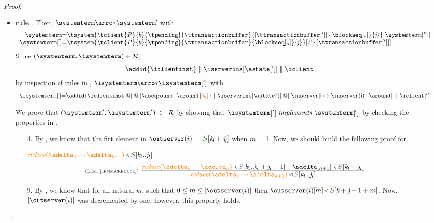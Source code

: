 \begin{proof}
\begin{itemize}
\begin{itemize}
				
				
				\item {\bf rule }. Then, $\systemterm  \arroi{\tau} \systemterm '$ with 
				\[\begin{array}{r@{=}l}
					\systemterm & \tsystem{\tclient{\tprogram}{\tknown}{\tpending}{\ttransactionbuffer}{[\tsenthead] \cdot \tsent}{\treceivebuffer}} [{\systemterm['']}]
					\\
					\systemterm['] & \tsystem{\tclient{\tprogram}{\tknown}{\tpending}{\ttransactionbuffer}{\tsent}{\treceivebuffer}}[\queuemessage \cdot [\tsenthead]]	
					
				  \end{array}
				\]
				Since $(\systemterm,\isystemterm)\in \mathcal{R}$,
				\[\addid{\iclientinst} \ \bigpar \ \iserverins[\astate[']] \ \bigpar\ \iclient\]
				by inspection of rules in \figref{}, 
				$\isystemterm \arroi{\tau} \isystemterm[']$ with
				\[\begin{array}{r@{=}l}
					\isystemterm['] & \addid{\iclientinst[@][@][\pending \cdot \around][\emptydelta]}
		\ \bigpar \ \iserverins[{\astate[']}][@][\inserver\upd{\cid}{\inserver(\cid)\cdot\around}]
		\ \bigpar\ \iclient[''] \\
				  \end{array}		
				\]
				
				We  prove that $(\systemterm',\isystemterm') \ \in \ \mathcal{R}$ by showing that $\implements{\isystemterm[']}{\systemterm[']}$ 
				by checking the properties in .			

						\begin{itemize}
							\item[4.] By , we know that the firt element in $\outserver(i)$ = $\queuemessage[\tknown_l+\treceivebuffer_l]$ when $m$ = 1. Now, we should build the following proof for 
							
						${\ireduce{\adelta_0\cdots\adelta_{h+1}}\triangleleft  \queuemessage[\tknown_l..\treceivebuffer_l]} \ $
					\[
						  \mathrulean{\lemref{lemma:reduce}}
						  {
								\ireduce{\adelta_0\cdots\adelta_{h}}\triangleleft  \queuemessage[\tknown_l..\tknown_l+\treceivebuffer_l - 1]
								\quad 
								\adelta[_{h+1}] \triangleleft \queuemessage[\tknown_l + \treceivebuffer_l] 							
							}
  						{\ireduce{\adelta_0\cdots\adelta_{h+1}}\triangleleft  \queuemessage[\tknown_l..\treceivebuffer_l]}  
					\]
							\item[9.] By , we know that for all natural $m$, such that $0 \leq m \leq |\outserver(i)|$ then $\outserver(i)[m] \triangleleft \queuemessage[\tknown + \treceivebuffer - 1 + m]$. Now, $|\outserver(i)|$ was decremented by one, however, this property holds.
						\end{itemize}
					

\end{itemize}
\end{itemize}
\end{proof}
